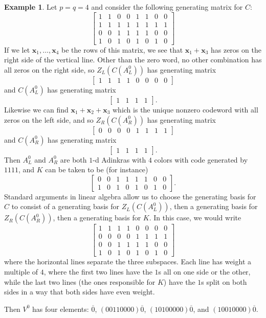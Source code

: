 \documentclass[12pt,twoside,singlespace]{article}
\numberwithin{equation}{section}
\theoremstyle{definition}
\newtheorem{ex}[equation]{Example}
\renewcommand{\vec}[1]{\mathbf{#1}}
\begin{document}
\begin{ex}
Let $p=q=4$ and consider the following generating matrix for $C$:
\[\left[\begin{array}{cccc|cccc}
1&1&0&0&1&1&0&0\\
1&1&1&1&1&1&1&1\\
0&0&1&1&1&1&0&0\\
1&0&1&0&1&0&1&0
\end{array}\right]\]
If we let $\vec{x}_1, \ldots, \vec{x}_4$ be the rows of this matrix, we see that $\vec{x}_1+\vec{x}_3$ has zeros on the right side of the vertical line.  Other than the zero word, no other combination has all zeros on the right side, so $Z_L(C(A_L^0))$ has generating matrix
\[\left[\begin{array}{cccc|cccc}
1&1&1&1&0&0&0&0
\end{array}\right]\]
and $C(A_L^0)$ has generating matrix
\[\left[\begin{array}{cccc}
1&1&1&1
\end{array}\right].\]
Likewise we can find $\vec{x}_1+\vec{x}_2+\vec{x}_3$ which is the unique nonzero codeword with all zeros on the left side, and so $Z_R(C(A_R^0))$ has generating matrix
\[\left[\begin{array}{cccc|cccc}
0&0&0&0&1&1&1&1
\end{array}\right]\]
and $C(A_R^0)$ has generating matrix
\[\left[\begin{array}{cccc}
1&1&1&1
\end{array}\right].\]
Then $A_L^0$ and $A_R^0$ are both $1$-d Adinkras with $4$ colors with code generated by $1111$, and $K$ can be taken to be (for instance)
\[\left[\begin{array}{cccc|cccc}
0&0&1&1&1&1&0&0\\
1&0&1&0&1&0&1&0
\end{array}\right].\]
Standard arguments in linear algebra allow us to choose the generating basis for $C$ to consist of a generating basis for $Z_L(C(A_L^0))$, then a generating basis for $Z_R(C(A_R^0))$, then a generating basis for $K$.  In this case, we would write
\[\left[\begin{array}{cccc|cccc}
1&1&1&1&0&0&0&0\\\hline
0&0&0&0&1&1&1&1\\\hline
0&0&1&1&1&1&0&0\\
1&0&1&0&1&0&1&0
\end{array}\right]\]
where the horizontal lines separate the three subspaces.  Each line has weight a multiple of $4$, where the first two lines have the $1$s all on one side or the other, while the last two lines (the ones responsible for $K$) have the $1$s split on both sides in a way that both sides have even weight.

Then $V^0$ has four elements: $\overline{0}$, $(00110000)\overline{0}$, $(10100000)\overline{0}$, and $(10010000)\overline{0}$.
\end{ex}
\end{document}
